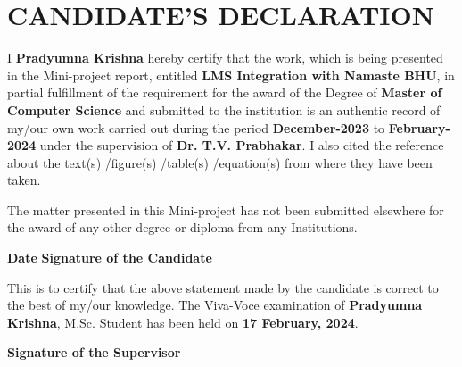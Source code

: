 \newpage

\chapter*{CANDIDATE’S DECLARATION}

I \textbf{Pradyumna Krishna} hereby certify that the work, which is being presented in the Mini-project report, entitled \textbf{LMS Integration with Namaste BHU}, in partial fulfillment of the requirement for the award of the Degree of \textbf{Master of Computer Science} and submitted to the institution is an authentic record of my/our own work carried out during the period \textbf{December-2023} to \textbf{February-2024} under the supervision of \textbf{Dr. T.V. Prabhakar}. I also cited the reference about the text(s) /figure(s) /table(s) /equation(s) from where they have been taken.

The matter presented in this Mini-project has not been submitted elsewhere for the award of any other degree or diploma from any Institutions.

\vspace{4cm}

\textbf{Date}
\hfill
\textbf{Signature of the Candidate}

\vspace{2cm}

This is to certify that the above statement made by the candidate is correct to the best of my/our knowledge. The Viva-Voce examination of \textbf{Pradyumna Krishna}, M.Sc. Student has been held on \textbf{17 February, 2024}.

\vspace{1cm}\hfill
\textbf{Signature of the Supervisor}
